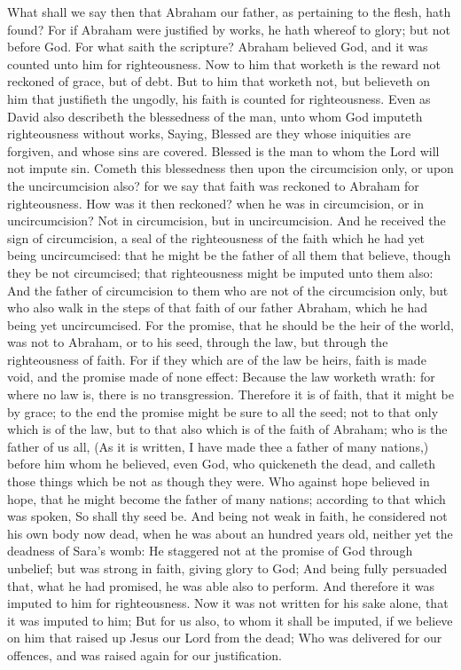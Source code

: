  What shall we say then that Abraham our father, as
pertaining to the flesh, hath found?  For if Abraham were
justified by works, he hath whereof to glory; but not before God.
 For what saith the scripture? Abraham believed God, and it
was counted unto him for righteousness.  Now to him that
worketh is the reward not reckoned of grace, but of debt. 
But to him that worketh not, but believeth on him that justifieth the
ungodly, his faith is counted for righteousness.  Even as
David also describeth the blessedness of the man, unto whom God imputeth
righteousness without works,  Saying, Blessed are they whose
iniquities are forgiven, and whose sins are covered. 
Blessed is the man to whom the Lord will not impute sin. 
Cometh this blessedness then upon the circumcision only, or upon the
uncircumcision also? for we say that faith was reckoned to Abraham for
righteousness.  How was it then reckoned? when he was in
circumcision, or in uncircumcision? Not in circumcision, but in
uncircumcision.  And he received the sign of circumcision,
a seal of the righteousness of the faith which he had yet being
uncircumcised: that he might be the father of all them that believe,
though they be not circumcised; that righteousness might be imputed unto
them also:  And the father of circumcision to them who are
not of the circumcision only, but who also walk in the steps of that
faith of our father Abraham, which he had being yet uncircumcised.
 For the promise, that he should be the heir of the world,
was not to Abraham, or to his seed, through the law, but through the
righteousness of faith.  For if they which are of the law
be heirs, faith is made void, and the promise made of none effect:
 Because the law worketh wrath: for where no law is, there
is no transgression.  Therefore it is of faith, that it
might be by grace; to the end the promise might be sure to all the seed;
not to that only which is of the law, but to that also which is of the
faith of Abraham; who is the father of us all,  (As it is
written, I have made thee a father of many nations,) before him whom he
believed, even God, who quickeneth the dead, and calleth those things
which be not as though they were.  Who against hope
believed in hope, that he might become the father of many nations;
according to that which was spoken, So shall thy seed be. 
And being not weak in faith, he considered not his own body now dead,
when he was about an hundred years old, neither yet the deadness of
Sara's womb:  He staggered not at the promise of God
through unbelief; but was strong in faith, giving glory to God;
 And being fully persuaded that, what he had promised, he
was able also to perform.  And therefore it was imputed to
him for righteousness.  Now it was not written for his sake
alone, that it was imputed to him;  But for us also, to
whom it shall be imputed, if we believe on him that raised up Jesus our
Lord from the dead;  Who was delivered for our offences,
and was raised again for our justification.

